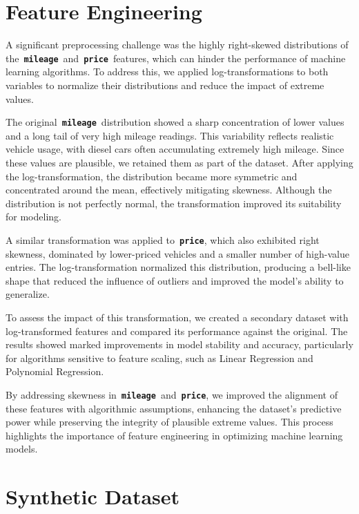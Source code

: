 \documentclass[a4paper,oneside,bibliography=totoc]{scrbook}
\begin{document}
\section{Feature Engineering}
\label{sec:featureEngineering}

A significant preprocessing challenge was the highly right-skewed distributions of the~\textbf{\texttt{mileage}}~and~\textbf{\texttt{price}}~features, which can hinder the performance of machine learning algorithms. To address this, we applied log-transformations to both variables to normalize their distributions and reduce the impact of extreme values. 

The original~\textbf{\texttt{mileage}}~distribution showed a sharp concentration of lower values and a long tail of very high mileage readings. This variability reflects realistic vehicle usage, with diesel cars often accumulating extremely high mileage. Since these values are plausible, we retained them as part of the dataset. After applying the log-transformation, the distribution became more symmetric and concentrated around the mean, effectively mitigating skewness. Although the distribution is not perfectly normal, the transformation improved its suitability for modeling.

A similar transformation was applied to~\textbf{\texttt{price}}, which also exhibited right skewness, dominated by lower-priced vehicles and a smaller number of high-value entries. The log-transformation normalized this distribution, producing a bell-like shape that reduced the influence of outliers and improved the model's ability to generalize.

To assess the impact of this transformation, we created a secondary dataset with log-transformed features and compared its performance against the original. The results showed marked improvements in model stability and accuracy, particularly for algorithms sensitive to feature scaling, such as Linear Regression and Polynomial Regression.

By addressing skewness in~\textbf{\texttt{mileage}}~and~\textbf{\texttt{price}}, we improved the alignment of these features with algorithmic assumptions, enhancing the dataset's predictive power while preserving the integrity of plausible extreme values. This process highlights the importance of feature engineering in optimizing machine learning models.

\section{Synthetic Dataset}
\label{sec:syntheticDataset}
\end{document}
